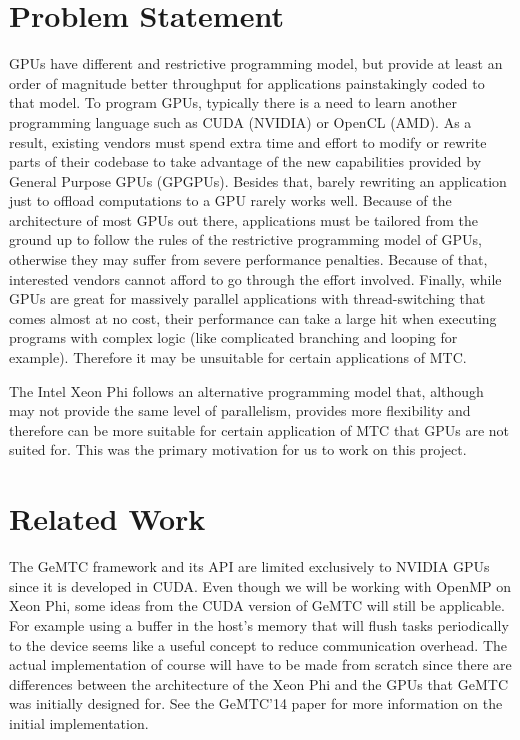 \documentclass[10pt, conference, compsocconf]{IEEEtran}
\begin{document}
\section{Problem Statement}
GPUs have different and restrictive programming model, but provide at least an order of magnitude better throughput for applications painstakingly coded to that model. To program GPUs, typically there is a need to learn another programming language such as CUDA (NVIDIA) or OpenCL (AMD). As a result, existing vendors must spend extra time and effort to modify or rewrite parts of their codebase to take advantage of the new capabilities provided by General Purpose GPUs (GPGPUs). Besides that, barely rewriting an application just to offload computations to a GPU rarely works well. Because of the architecture of most GPUs out there, applications must be tailored from the ground up to follow the rules of the restrictive programming model of GPUs, otherwise they may suffer from severe performance penalties. Because of that, interested vendors cannot afford to go through the effort involved. Finally, while GPUs are great for massively parallel applications with thread-switching that comes almost at no cost, their performance can take a large hit when executing programs with complex logic (like complicated branching and looping for example). Therefore it may be unsuitable for certain applications of MTC.

The Intel Xeon Phi follows an alternative programming model that, although may not provide the same level of parallelism, provides more flexibility and therefore can be more suitable for certain application of MTC that GPUs are not suited for. This was the primary motivation for us to work on this project.

\section{Related Work}
The GeMTC framework and its API are limited exclusively to NVIDIA GPUs since it is developed in CUDA. Even though we will be working with OpenMP on Xeon Phi, some ideas from the CUDA version of GeMTC will still be applicable. For example using a buffer in the host’s memory that will flush tasks periodically to the device seems like a useful concept to reduce communication overhead. The actual implementation of course will have to be made from scratch since there are differences between the architecture of the Xeon Phi and the GPUs that GeMTC was initially designed for. See the GeMTC’14 paper for more information on the initial implementation.
\end{document}
